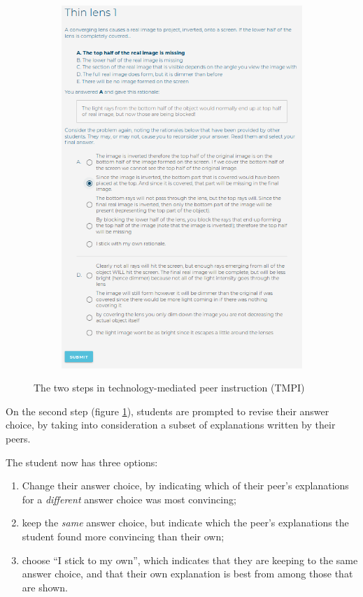 \documentclass[notitlepage,12pt]{jedm}
\begin{document}
\begin{figure}[h]
\begin{subfigure}[b]{0.45\textwidth}
		\includegraphics[width=\textwidth]{img/question_review}
		\caption{}
		\label{fig:question_review}
	\end{subfigure}
	\caption{The two steps in technology-mediated peer 
	instruction (TMPI)}
	\label{fig:tmpi}
\end{figure}



On the second step (figure \ref{fig:question_review}), students are prompted to 
revise 
their answer choice, by taking into consideration a subset of explanations 
written by their peers.

The student now has three options:
\begin{enumerate}
	\item Change their answer choice, by indicating which of their peer's 
	explanations for a \textit{different} answer choice was most convincing;
	\item keep the \textit{same} answer choice, but indicate which the peer's 
	explanations the student found more convincing than their own;
	\item choose ``I stick to my own'', which indicates that they are keeping 
	to the same answer choice, and that their own explanation is best from 
	among those that are shown.
\end{enumerate}
\end{document}
